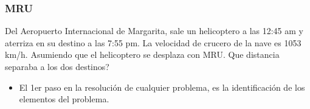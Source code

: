 \documentclass{beamer}
\begin{document}
\begin{frame}
\begin{center}
\end{center}
                                                              
                                                               
                                                               
                                                               
                                                               
\end{frame}

\begin{frame}
\frametitle{MRU}
% 
 
Del Aeropuerto Internacional de Margarita, sale un {{
helicoptero }} a las 12:45 am y aterriza en su destino a las
7:55 pm. La velocidad de crucero de la nave es 1053
km/h. Asumiendo que el{{ helicoptero }} se desplaza con
MRU. Que distancia separaba a los dos destinos?

 
\begin{itemize}                                                              

\item El 1er paso en la resoluci\'on de cualquier problema, es la
identificaci\'on de los elementos del problema.            
              
\end{itemize}

\end{frame}
\end{document}
